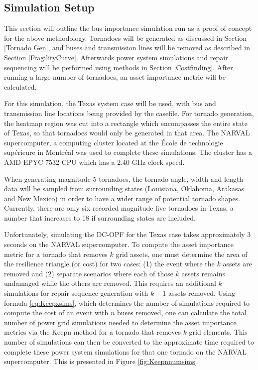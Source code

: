 \documentclass[12pt]{article}
\begin{document}
\subsection{Simulation Setup}
This section will outline the bus importance simulation run as a proof of concept for the above methodology. Tornadoes will be generated as discussed in Section \ref{Tornado Gen}, and buses and transmission lines will be removed as described in Section \ref{FragilityCurve}. Afterwards power system simulations and repair sequencing will be performed using methods in Section \ref{Costfinding}. After running a large number of tornadoes, an asset importance metric will be calculated. \par
For this simulation, the Texas system case will be used, with bus and transmission line locations being provided by the casefile. For tornado generation, the heatmap region was cut into a rectangle which encompasses the entire state of Texas, so that tornadoes would only be generated in that area. The NARVAL supercomputer, a computing cluster located at the École de technologie supérieure in Montréal \cite{NARVAL} was used to complete these simulations. The cluster has a AMD EPYC 7532 CPU which has a 2.40 GHz clock speed. \par
When generating magnitude 5 tornadoes, the tornado angle, width and length data will be sampled from surrounding states (Louisiana, Oklahoma, Arakasas and New Mexico) in order to have a wider range of potential tornado shapes. Currently, there are only six recorded magnitude five tornadoes in Texas, a number that increases to 18 if surrounding states are included. \par
Unfortunately, simulating the DC-OPF for the Texas case takes approximately 3 seconds on the NARVAL supercomputer. To compute the asset importance metric for a tornado that removes $k$ grid assets, one must determine the area of the resilience triangle (or cost) for two cases: (1) the event where the $k$ assets are removed and (2) separate scenarios where each of those $k$ assets remains undamaged while the others are removed. This requires an additional $k$ simulations for repair sequence generation with $k-1$ assets removed. Using formula \ref{eq:Keepxsims}, which determines the number of simulations required to compute the cost of an event with $n$ buses removed, one can calculate the total number of power grid simulations needed to determine the asset importance metrics via the Keepn method for a tornado that removes $k$ grid elements. This number of simulations can then be converted to the approximate time required to complete these power system simulations for that one tornado on the NARVAL supercomputer. This is presented in Figure \ref{fig:Keepnnumsims}. \par
\end{document}
